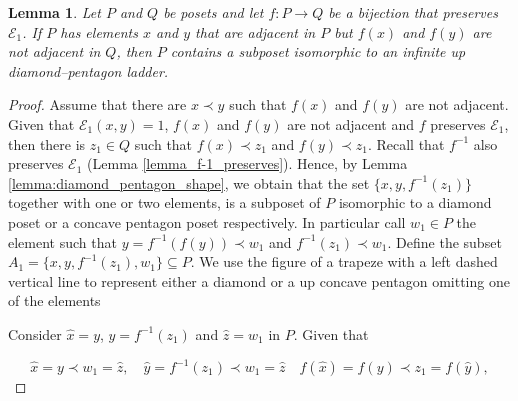 \documentclass{article}[12pt]
\theoremstyle{exampstyle}
\newtheorem{lemma}[theorem]{Lemma}
\theoremstyle{remark}
\newcommand{\E}{\mathcal{E}}
\begin{document}
\begin{lemma}
   Let $P$ and $Q$ be posets and let $f: P \to Q$ be a bijection that preserves $\E_1$. If $P$ has elements $x$ and $y$ that are adjacent in $P$ but $f(x)$ and $f(y)$ are not adjacent in $Q$, then $P$ contains a subposet isomorphic to an infinite up diamond–pentagon ladder.
    \label{lemma:covers_preserved_E}
\end{lemma}
\begin{proof}
    Assume that there are $x \prec y$ such that $f(x)$ and $f(y)$ are not adjacent. Given that $\E_1(x,y) = 1$, $f(x)$ and $f(y)$ are not adjacent and $f$ preserves $\E_1$, then there is $z_1 \in Q$ such that  $f(x) \prec z_1$ and $f(y) \prec z_1$. Recall that $f^{-1}$ also preserves $\E_1$ (Lemma \ref{lemma_f-1_preserves}). Hence, by Lemma \ref{lemma:diamond_pentagon_shape}, we obtain that the set 
    $\{x, y, f^{-1}(z_1)\}$ together with one or two elements, is a subposet of $P$ isomorphic to a diamond poset or a concave pentagon poset respectively.  In particular call $w_1 \in P$ the element such that $y = f^{-1}(f(y)) \prec w_1$ and $f^{-1}(z_1) \prec w_1$. Define the  subset $A_1 = \{ x,y,f^{-1}(z_1), w_1 \} \subseteq P$. We use the figure of a trapeze with a left dashed vertical line to represent either a diamond or a up concave pentagon omitting one of the elements

    \begin{center}
    \end{center}
    

    Consider $\hat{x} = y$, $\hat{y} = f^{-1}(z_1)$ and $\hat{z} = w_1$ in $P$. Given that 
    
    \[\hat{x} = y \prec w_1 = \hat{z}, \quad  \hat{y} = f^{-1}(z_1) \prec w_1 = \hat{z} \quad f(\hat{x}) = f(y) \prec z_1 = f(\hat{y}), \] 
    

\end{proof}
\end{document}
